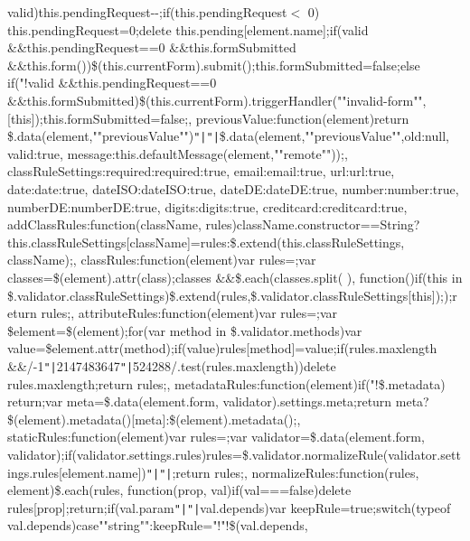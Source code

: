 valid)\lcurly{}this.\+pending\+Request-\/-\/;if(this.\+pending\+Request$<$ 0) this.\+pending\+Request=0;delete this.\+pending[element.\+name];if(valid \&\&this.\+pending\+Request==0 \&\&this.\+form\+Submitted \&\&this.\+form())\lcurly{}\$(this.\+current\+Form).\+submit();this.\+form\+Submitted=false;\rcurly{}else if("!valid \&\&this.\+pending\+Request==0 \&\&this.\+form\+Submitted)\lcurly{}\$(this.\+current\+Form).\+trigger\+Handler(""invalid-\/form"", [this]);this.\+form\+Submitted=false;\rcurly{}\rcurly{}, previous\+Value\+:function(element)\lcurly{}return \$.\+data(element,""previous\+Value"")\texttt{"|}\texttt{"|}\$.\+data(element,""previous\+Value"",\lcurly{}old\+:null, valid\+:true, message\+:this.\+default\+Message(element,""remote"")\rcurly{});\rcurly{}\rcurly{}, class\+Rule\+Settings\+:\lcurly{}required\+:\lcurly{}required\+:true\rcurly{}, email\+:\lcurly{}email\+:true\rcurly{}, url\+:\lcurly{}url\+:true\rcurly{}, date\+:\lcurly{}date\+:true\rcurly{}, date\+I\+S\+O\+:\lcurly{}date\+I\+S\+O\+:true\rcurly{}, date\+D\+E\+:\lcurly{}date\+D\+E\+:true\rcurly{}, number\+:\lcurly{}number\+:true\rcurly{}, number\+D\+E\+:\lcurly{}number\+D\+E\+:true\rcurly{}, digits\+:\lcurly{}digits\+:true\rcurly{}, creditcard\+:\lcurly{}creditcard\+:true\rcurly{}\rcurly{}, add\+Class\+Rules\+:function(class\+Name, rules)\lcurly{}class\+Name.\+constructor==\+String?this.\+class\+Rule\+Settings[class\+Name]=rules\+:\$.\+extend(this.\+class\+Rule\+Settings, class\+Name);\rcurly{}, class\+Rules\+:function(element)\lcurly{}var rules=\lcurly{}\rcurly{};var classes=\$(element).\+attr(\textquotesingle{}class\textquotesingle{});classes \&\&\$.\+each(classes.\+split(\textquotesingle{} \textquotesingle{}), function()\lcurly{}if(this in \$.\+validator.\+class\+Rule\+Settings)\lcurly{}\$.\+extend(rules,\$.\+validator.\+class\+Rule\+Settings[this]);\rcurly{}\rcurly{});return rules;\rcurly{}, attribute\+Rules\+:function(element)\lcurly{}var rules=\lcurly{}\rcurly{};var \$element=\$(element);for(var method in \$.\+validator.\+methods)\lcurly{}var value=\$element.\+attr(method);if(value)\lcurly{}rules[method]=value;\rcurly{}\rcurly{}if(rules.\+maxlength \&\&/-\/1\texttt{"|}2147483647\texttt{"|}524288/.\+test(rules.\+maxlength))\lcurly{}delete rules.\+maxlength;\rcurly{}return rules;\rcurly{}, metadata\+Rules\+:function(element)\lcurly{}if("!\$.\+metadata) return\lcurly{}\rcurly{};var meta=\$.\+data(element.\+form, \textquotesingle{}validator\textquotesingle{}).\+settings.\+meta;return meta?\$(element).\+metadata()[meta]\+:\$(element).\+metadata();\rcurly{}, static\+Rules\+:function(element)\lcurly{}var rules=\lcurly{}\rcurly{};var validator=\$.\+data(element.\+form, \textquotesingle{}validator\textquotesingle{});if(validator.\+settings.\+rules)\lcurly{}rules=\$.\+validator.\+normalize\+Rule(validator.\+settings.\+rules[element.\+name])\texttt{"|}\texttt{"|}\lcurly{}\rcurly{};\rcurly{}return rules;\rcurly{}, normalize\+Rules\+:function(rules, element)\lcurly{}\$.\+each(rules, function(prop, val)\lcurly{}if(val===false)\lcurly{}delete rules[prop];return;\rcurly{}if(val.\+param\texttt{"|}\texttt{"|}val.\+depends)\lcurly{}var keep\+Rule=true;switch(typeof val.\+depends)\lcurly{}case""string""\+:keep\+Rule="!"!\$(val.\+depends, 